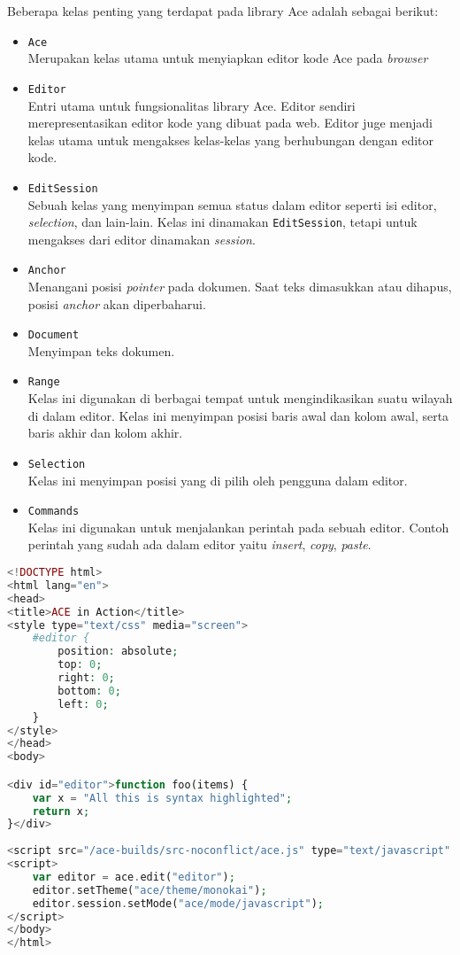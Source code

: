 Beberapa kelas penting yang terdapat pada library Ace adalah sebagai berikut:

\begin{itemize}
	\item \verb|Ace| \\
	      Merupakan kelas utama untuk menyiapkan editor kode Ace pada \textit{browser}
	\item \verb|Editor| \\
	      Entri utama untuk fungsionalitas library Ace. Editor sendiri merepresentasikan editor kode yang dibuat pada web. Editor juge menjadi kelas utama untuk mengakses kelas-kelas yang berhubungan dengan editor kode.

	\item \verb|EditSession| \\
	      Sebuah kelas yang menyimpan semua status dalam editor seperti isi editor, \textit{selection}, dan lain-lain. Kelas ini dinamakan \verb|EditSession|, tetapi untuk mengakses dari editor dinamakan \textit{session}.

	\item \verb|Anchor| \\
	      Menangani posisi \textit{pointer} pada dokumen. Saat teks dimasukkan atau dihapus, posisi \textit{anchor} akan diperbaharui.
	\item \verb|Document| \\
	      Menyimpan teks dokumen.
	\item \verb|Range| \\
	      Kelas ini digunakan di berbagai tempat untuk mengindikasikan suatu wilayah di dalam editor. Kelas ini menyimpan posisi baris awal dan kolom awal, serta baris akhir dan kolom akhir.
	\item \verb|Selection| \\
	      Kelas ini menyimpan posisi yang di pilih oleh pengguna dalam editor.
	\item \verb|Commands| \\
	      Kelas ini digunakan untuk menjalankan perintah pada sebuah editor. Contoh perintah yang sudah ada dalam editor yaitu \textit{insert}, \textit{copy}, \textit{paste}.
\end{itemize}

\begin{lstlisting}[language={php}, caption={Contoh kode pengunaan Ace}, label={kode:2:5:ace}]
<!DOCTYPE html>
<html lang="en">
<head>
<title>ACE in Action</title>
<style type="text/css" media="screen">
	#editor { 
		position: absolute;
		top: 0;
		right: 0;
		bottom: 0;
		left: 0;
	}
</style>
</head>
<body>

<div id="editor">function foo(items) {
	var x = "All this is syntax highlighted";
	return x;
}</div>
	
<script src="/ace-builds/src-noconflict/ace.js" type="text/javascript" charset="utf-8"></script>
<script>
	var editor = ace.edit("editor");
	editor.setTheme("ace/theme/monokai");
	editor.session.setMode("ace/mode/javascript");
</script>
</body>
</html>
\end{lstlisting}


